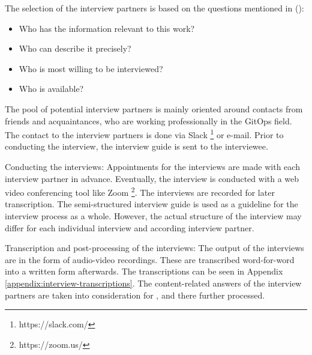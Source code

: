The selection of the interview partners is based on the questions mentioned in
\citeauthor{glaser2010experteninterviews} (\citeyear{glaser2010experteninterviews}):

\begin{itemize}
	\item Who has the information relevant to this work?
	\item Who can describe it precisely?
	\item Who is most willing to be interviewed?
	\item Who is available?
\end{itemize}

The pool of potential interview partners is mainly oriented around
contacts from friends and acquaintances,
who are working professionally in the GitOps field.
The contact to the interview partners is done via Slack
\footnote{https://slack.com/}
or e-mail.
Prior to conducting the interview, the interview guide is sent to the interviewee.

Conducting the interviews:
Appointments for the interviews are made with each interview partner in advance. 
Eventually, the interview is conducted with a web video conferencing tool like Zoom
\footnote{https://zoom.us/}.
The interviews are recorded for later transcription.
The semi-structured interview guide
is used as a guideline for the interview process as a whole.
However, the actual structure of the interview may differ for each individual interview and according interview partner.

Transcription and post-processing of the interviews:
The output of the interviews are in the form of audio-video recordings.
These are transcribed word-for-word into a written form afterwards.
The transcriptions can be seen in Appendix \ref{appendix:interview-transcriptions}.
The content-related answers of the interview partners are taken into consideration
for , and there further processed.




